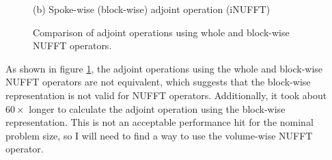 \documentclass[11pt]{article}
\begin{document}
\begin{figure}[H]
\begin{minipage}{0.45\textwidth}
    \caption*{(b) Spoke-wise (block-wise) adjoint operation (iNUFFT)}
  \end{minipage}
  \caption{Comparison of adjoint operations using whole and block-wise NUFFT operators.}
  \label{fig:comparing_inuffts}
\end{figure}
As shown in figure \ref{fig:comparing_inuffts}, the adjoint operations using the whole and block-wise NUFFT operators
are not equivalent, which suggests that the block-wise representation is not valid for NUFFT operators.
Additionally, it took about $60\times$ longer to calculate the adjoint operation using the block-wise representation.
This is not an acceptable performance hit for the nominal problem size, so I will need to find a way to use the volume-wise NUFFT operator.



\end{document}
